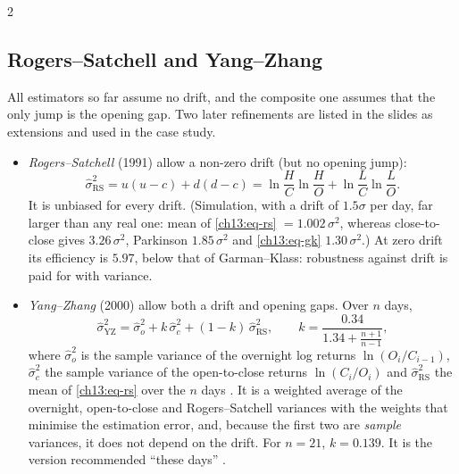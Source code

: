 \begin{paracol}{2}
\subsection{Rogers--Satchell and Yang--Zhang}\label{ch13:sec-rsyz}
\begin{secondary}
All estimators so far assume no drift, and the composite one assumes that the only jump is the opening gap. Two later refinements are
listed in the slides as extensions and used in the case study.
\begin{itemize}
  \item \emph{Rogers--Satchell} (1991) allow a non-zero drift (but no opening jump):
        \begin{equation}\label{ch13:eq-rs}
          \hat\sigma^2_{\mathrm{RS}}=u(u-c)+d(d-c)=\ln\frac HC\ln\frac HO+\ln\frac LC\ln\frac LO .
        \end{equation}
        It is unbiased for every drift. (Simulation, with a drift of $1.5\sigma$ per day, far larger than any real one: mean of
        \eqref{ch13:eq-rs} $=1.002\,\sigma^2$, whereas close-to-close gives $3.26\,\sigma^2$, Parkinson $1.85\,\sigma^2$ and \eqref{ch13:eq-gk} $1.30\,\sigma^2$.) At zero drift its
        efficiency is $5.97$, below that of Garman--Klass: robustness against drift is paid for with variance.
  \item \emph{Yang--Zhang} (2000) allow both a drift and opening gaps. Over $n$ days,
        \begin{equation}\label{ch13:eq-yz}
          \hat\sigma^2_{\mathrm{YZ}}=\hat\sigma^2_{o}+k\,\hat\sigma^2_{c}+(1-k)\,\hat\sigma^2_{\mathrm{RS}},\qquad
          k=\frac{0.34}{1.34+\frac{n+1}{n-1}},
        \end{equation}
        where $\hat\sigma^2_o$ is the sample variance of the overnight log returns $\ln(O_i/C_{i-1})$, $\hat\sigma_c^2$ the sample variance of the
        open-to-close returns $\ln(C_i/O_i)$ and $\hat\sigma^2_{\mathrm{RS}}$ the mean of \eqref{ch13:eq-rs} over the $n$ days
        . It is a weighted average of the overnight, open-to-close and Rogers--Satchell variances with the weights that minimise the estimation error,
        and, because the first two are \emph{sample} variances, it does not depend on the drift. For $n=21$, $k=0.139$. It is the
        version recommended ``these days'' .
\end{itemize}
\end{secondary}


\end{paracol}
